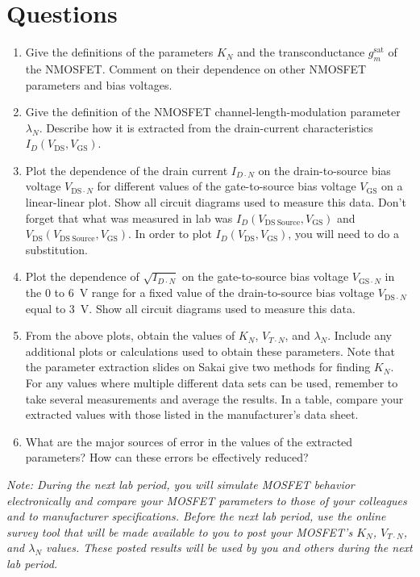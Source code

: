 \documentclass[12pt]{../manual}
\begin{document}
\section{Questions}
\begin{enumerate}
\item Give the definitions of the parameters $K_N$ and the transconductance $g_m^\mathrm{sat}$ of the NMOSFET. Comment on their dependence on other NMOSFET parameters and bias voltages.
\item Give the definition of the NMOSFET channel-length-modulation parameter $\lambda_N$. Describe how it is extracted from the drain-current characteristics $I_D(V_{\mathrm{DS}}, V_{\mathrm{GS}})$.
\item Plot the dependence of the drain current $I_{D \cdot N}$ on the drain-to-source bias voltage $V_{\mathrm{DS}\cdot N}$ for different values of the gate-to-source bias voltage $V_{\mathrm{GS}}$ on a linear-linear plot. Show all circuit diagrams used to measure this data. Don't forget that what was measured in lab was $I_D(V_{\mathrm{DS~Source}}, V_{\mathrm{GS}})$ and $V_{\mathrm{DS}}(V_{\mathrm{DS~Source}}, V_{\mathrm{GS}})$. In order to plot $I_D(V_{\mathrm{DS}}, V_{\mathrm{GS}})$, you will need to do a substitution.
\item Plot the dependence of $\sqrt{I_{D \cdot N}}$ on the gate-to-source bias voltage $ V_{\mathrm{GS} \cdot N}$ in the 0 to \SI{6}{\volt} range for a fixed value of the drain-to-source bias voltage $V_{\mathrm{DS} \cdot N}$ equal to \SI{3}{\volt}. Show all circuit diagrams used to measure this data.
\item From the above plots, obtain the values of $K_N$, $V_{T \cdot N}$, and $\lambda_N$. Include any additional plots or calculations used to obtain these parameters. Note that the parameter extraction slides on Sakai give two methods for finding $K_N$. For any values where multiple different data sets can be used, remember to take several measurements and average the results. In a table, compare your extracted values with those listed in the manufacturer's data sheet.
\item What are the major sources of error in the values of the extracted parameters? How can these errors be effectively reduced?
\end{enumerate}
\textit{Note: During the next lab period, you will simulate MOSFET behavior electronically and compare your MOSFET parameters to those of your colleagues and to manufacturer specifications. Before the next lab period, use the online survey tool that will be made available to you to post your MOSFET's $K_N$, $V_{T \cdot N}$, and $\lambda_N$ values. These posted results will be used by you and others during the next lab period.}
\end{document}
